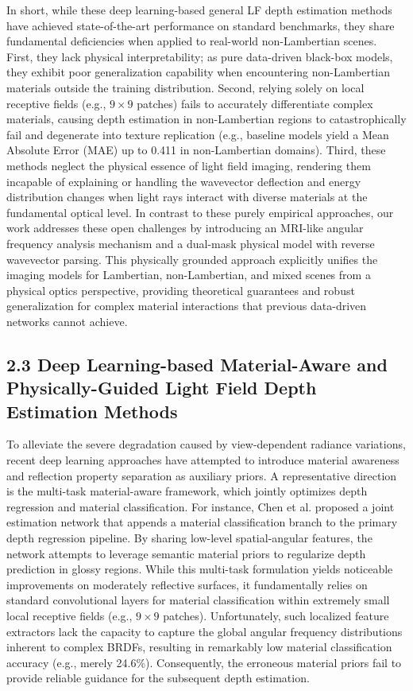 In short, while these deep learning-based general LF depth estimation methods have achieved state-of-the-art performance on standard benchmarks, they share fundamental deficiencies when applied to real-world non-Lambertian scenes. First, they lack physical interpretability; as pure data-driven black-box models, they exhibit poor generalization capability when encountering non-Lambertian materials outside the training distribution. Second, relying solely on local receptive fields (e.g., \(9 \times 9\) patches) fails to accurately differentiate complex materials, causing depth estimation in non-Lambertian regions to catastrophically fail and degenerate into texture replication (e.g., baseline models yield a Mean Absolute Error (MAE) up to 0.411 in non-Lambertian domains). Third, these methods neglect the physical essence of light field imaging, rendering them incapable of explaining or handling the wavevector deflection and energy distribution changes when light rays interact with diverse materials at the fundamental optical level. In contrast to these purely empirical approaches, our work addresses these open challenges by introducing an MRI-like angular frequency analysis mechanism and a dual-mask physical model with reverse wavevector parsing. This physically grounded approach explicitly unifies the imaging models for Lambertian, non-Lambertian, and mixed scenes from a physical optics perspective, providing theoretical guarantees and robust generalization for complex material interactions that previous data-driven networks cannot achieve.

\subsection{2.3 Deep Learning-based Material-Aware and Physically-Guided Light Field Depth Estimation Methods}

To alleviate the severe degradation caused by view-dependent radiance variations, recent deep learning approaches have attempted to introduce material awareness and reflection property separation as auxiliary priors. A representative direction is the multi-task material-aware framework, which jointly optimizes depth regression and material classification. For instance, Chen et al.  proposed a joint estimation network that appends a material classification branch to the primary depth regression pipeline. By sharing low-level spatial-angular features, the network attempts to leverage semantic material priors to regularize depth prediction in glossy regions. While this multi-task formulation yields noticeable improvements on moderately reflective surfaces, it fundamentally relies on standard convolutional layers for material classification within extremely small local receptive fields (e.g., \(9 \times 9\) patches). Unfortunately, such localized feature extractors lack the capacity to capture the global angular frequency distributions inherent to complex BRDFs, resulting in remarkably low material classification accuracy (e.g., merely 24.6\%). Consequently, the erroneous material priors fail to provide reliable guidance for the subsequent depth estimation.

